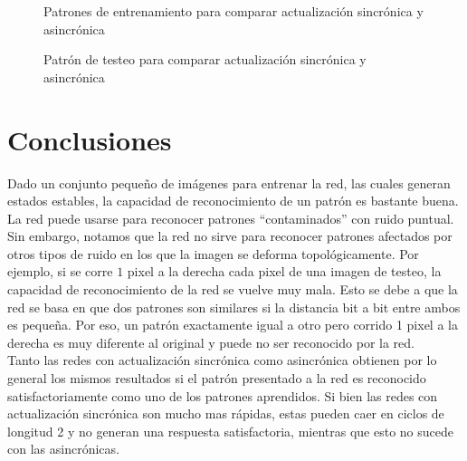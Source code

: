 \documentclass{sig-alternate}
\begin{document}
\begin{figure}[h]
         \begin{center}
		\hspace{20pt}
	\caption{Patrones de entrenamiento para comparar actualización sincrónica y asincrónica}
	\label{fig:trainpatasync}
         \end{center}
         
	\end{figure}
\begin{figure}[h]
         \begin{center}
         \end{center}
         \caption{Patrón de testeo para comparar actualización sincrónica y asincrónica}
         \label{fig:dosCirculos}
	\end{figure}


\section*{Conclusiones}
Dado un conjunto pequeño de imágenes para entrenar la red, las cuales generan estados estables, la capacidad de reconocimiento de un patrón es bastante buena.
La red puede usarse para reconocer patrones “contaminados” con ruido puntual.
Sin embargo, notamos que la red no sirve para reconocer patrones afectados por otros tipos de ruido en los que la imagen se deforma topológicamente.
Por ejemplo, si se corre $1$ pixel a la derecha cada pixel de una imagen de testeo, la capacidad de reconocimiento de la red se vuelve muy mala.
Esto se debe a que la red se basa en que dos patrones son similares si la distancia bit a bit entre ambos es pequeña.
Por eso, un patrón exactamente igual a otro pero corrido 1 pixel a la derecha es muy diferente al original y puede no ser reconocido por la red.\\
Tanto las redes con actualización sincrónica como asincrónica obtienen por lo general los mismos resultados si el patrón presentado a la red es reconocido satisfactoriamente como uno de los patrones aprendidos.
Si bien las redes con actualización sincrónica son mucho mas rápidas, estas pueden caer en ciclos de longitud 2 y  no generan una respuesta satisfactoria, mientras que esto no sucede con las asincrónicas.
\end{document}
